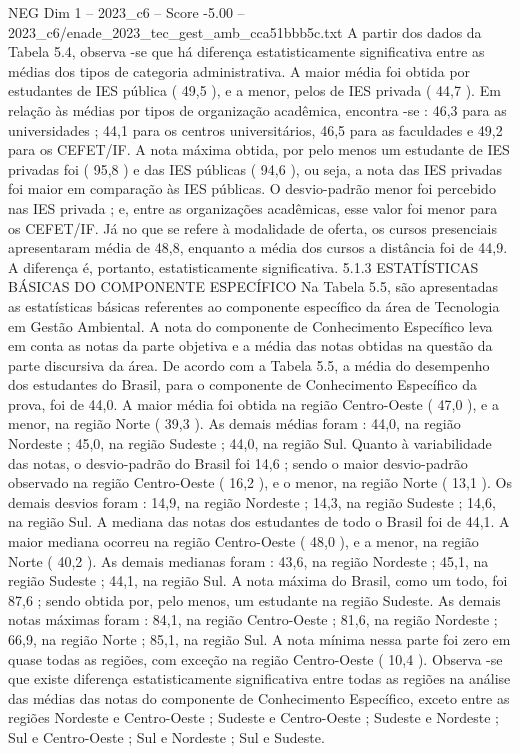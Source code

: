 \begin{textsample}{NEG Dim 1 – 2023\_c6 – Score -5.00 – 2023\_c6/enade\_2023\_tec\_gest\_amb\_cca51bbb5c.txt}
A partir dos dados da Tabela 5.4, observa -se que há diferença estatisticamente significativa entre as médias dos tipos de categoria administrativa.
A maior média foi obtida por estudantes de IES pública ( 49,5 ), e a menor, pelos de IES privada ( 44,7 ).
Em relação às médias por tipos de organização acadêmica, encontra -se : 46,3 para as universidades ; 44,1 para os centros universitários, 46,5 para as faculdades e 49,2 para os CEFET/IF.
A nota máxima obtida, por pelo menos um estudante de IES privadas foi ( 95,8 ) e das IES públicas ( 94,6 ), ou seja, a nota das IES privadas foi maior em comparação às IES públicas.
O desvio-padrão menor foi percebido nas IES privada ; e, entre as organizações acadêmicas, esse valor foi menor para os CEFET/IF.
Já no que se refere à modalidade de oferta, os cursos presenciais apresentaram média de 48,8, enquanto a média dos cursos a distância foi de 44,9.
A diferença é, portanto, estatisticamente significativa. 5.1.3 ESTATÍSTICAS BÁSICAS DO COMPONENTE ESPECÍFICO Na Tabela 5.5, são apresentadas as estatísticas básicas referentes ao componente específico da área de Tecnologia em Gestão Ambiental.
A nota do componente de Conhecimento Específico leva em conta as notas da parte objetiva e a média das notas obtidas na questão da parte discursiva da área.
De acordo com a Tabela 5.5, a média do desempenho dos estudantes do Brasil, para o componente de Conhecimento Específico da prova, foi de 44,0.
A maior média foi obtida na região Centro-Oeste ( 47,0 ), e a menor, na região Norte ( 39,3 ).
As demais médias foram : 44,0, na região Nordeste ; 45,0, na região Sudeste ; 44,0, na região Sul.
Quanto à variabilidade das notas, o desvio-padrão do Brasil foi 14,6 ; sendo o maior desvio-padrão observado na região Centro-Oeste ( 16,2 ), e o menor, na região Norte ( 13,1 ).
Os demais desvios foram : 14,9, na região Nordeste ; 14,3, na região Sudeste ; 14,6, na região Sul.
A mediana das notas dos estudantes de todo o Brasil foi de 44,1.
A maior mediana ocorreu na região Centro-Oeste ( 48,0 ), e a menor, na região Norte ( 40,2 ).
As demais medianas foram : 43,6, na região Nordeste ; 45,1, na região Sudeste ; 44,1, na região Sul.
A nota máxima do Brasil, como um todo, foi 87,6 ; sendo obtida por, pelo menos, um estudante na região Sudeste.
As demais notas máximas foram : 84,1, na região Centro-Oeste ; 81,6, na região Nordeste ; 66,9, na região Norte ; 85,1, na região Sul.
A nota mínima nessa parte foi zero em quase todas as regiões, com exceção na região Centro-Oeste ( 10,4 ).
Observa -se que existe diferença estatisticamente significativa entre todas as regiões na análise das médias das notas do componente de Conhecimento Específico, exceto entre as regiões Nordeste e Centro-Oeste ; Sudeste e Centro-Oeste ; Sudeste e Nordeste ; Sul e Centro-Oeste ; Sul e Nordeste ; Sul e Sudeste.

\end{textsample}
